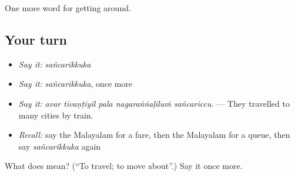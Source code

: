 \begin{grammarlens}[title={What you've built}]
One more word for getting around.
\end{grammarlens}

\subsection*{Your turn}
\begin{itemize}
\raggedright
  \item \emph{Say it:} \emph{sañcarikkuka}
  \item \emph{Say it:} \emph{sañcarikkuka}, once more
  \item \emph{Say it:} \emph{avar tīvaṇṭiyil pala nagaraṅṅaḷiluṁ sañcariccu.} — They travelled to many cities by train.
  \item \emph{Recall:} say the Malayalam for a fare, then the Malayalam for a queue, then say \emph{sañcarikkuka} again
\end{itemize}

\begin{tcolorbox}[breakable,colback=teal!4,colframe=teal!35!black,title={Before you move on}]
What does  mean? (\textquotedblleft{}To travel; to move about\textquotedblright{}.) Say it once more.
\end{tcolorbox}
